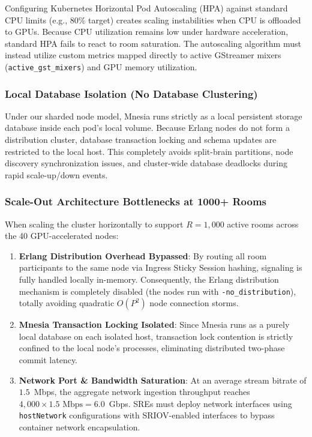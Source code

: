 \documentclass{article}
\begin{document}
Configuring Kubernetes Horizontal Pod Autoscaling (HPA) against standard CPU limits
(e.g., 80\% target) creates scaling instabilities when CPU is offloaded to GPUs.
Because CPU utilization remains low under hardware acceleration, standard HPA fails
to react to room saturation. The autoscaling algorithm must instead utilize custom
metrics mapped directly to active GStreamer mixers (\texttt{active\_gst\_mixers})
and GPU memory utilization.

\subsubsection*{Local Database Isolation (No Database Clustering)}

Under our sharded node model, Mnesia runs strictly as a local persistent storage
database inside each pod's local volume. Because Erlang nodes do not form a
distribution cluster, database transaction locking and schema updates are
restricted to the local host. This completely avoids split-brain partitions,
node discovery synchronization issues, and cluster-wide database deadlocks
during rapid scale-up/down events.

\subsubsection*{Scale-Out Architecture Bottlenecks at 1000+ Rooms}

When scaling the cluster horizontally to support $R = 1,000$ active rooms across the 40 GPU-accelerated nodes:
\begin{enumerate}
    \item \textbf{Erlang Distribution Overhead Bypassed}:
          By routing all room participants to the same node via Ingress Sticky Session hashing,
          signaling is fully handled locally in-memory. Consequently, the Erlang distribution
          mechanism is completely disabled (the nodes run with \texttt{-no\_distribution}),
          totally avoiding quadratic $O(P^2)$ node connection storms.
    \item \textbf{Mnesia Transaction Locking Isolated}: Since Mnesia runs as a purely local
          database on each isolated host, transaction lock contention is strictly confined
          to the local node's processes, eliminating distributed two-phase commit latency.
    \item \textbf{Network Port \& Bandwidth Saturation}: At an average stream bitrate of
          $1.5$~Mbps, the aggregate network ingestion throughput reaches $4,000 \times 1.5\text{ Mbps} = 6.0$~Gbps.
          SREs must deploy network interfaces using \texttt{hostNetwork} configurations
          with SRIOV-enabled interfaces to bypass container network encapsulation.
\end{enumerate}
\end{document}

